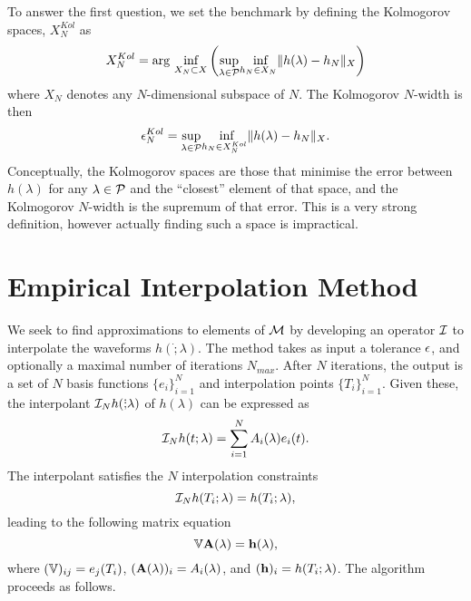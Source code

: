 To answer the first question, we set the benchmark by defining the Kolmogorov spaces, $X^{Kol}_N$ as
\begin{equation}
X^{Kol}_N = \mbox{arg }\underset{X_N \subset X}{\mbox{inf}}\left(\underset{\lambda \in \mathcal{P}}{\sup} \underset{h_N \in X_N}{\mbox{ inf}} \| h(\lambda) - h_N \|_X \right)
\end{equation} 
where $X_N$ denotes any $N$-dimensional subspace of $N$. The Kolmogorov $N$-width is then 
\begin{equation}
\epsilon^{Kol}_N = \underset{\lambda \in \mathcal{P}}{\sup} \underset{h_N \in X^{Kol}_N}{\mbox{ inf}} \| h(\lambda) - h_N \|_X .
\end{equation} 
Conceptually, the Kolmogorov spaces are those that minimise the error between $h(\lambda)$ for any $\lambda \in \mathcal{P}$ and the ``closest'' element of that space, and the Kolmogorov $N$-width is the supremum of that error. This is a very strong definition, however actually finding such a space is impractical. 

\section{Empirical Interpolation Method}

We seek to find approximations to elements of $\mathcal{M}$ by developing an operator $\mathcal{I}$ to interpolate the waveforms $h(\dot;\lambda)$. The method takes as input a tolerance ${\epsilon}$, and optionally a maximal number of iterations $N_{max}$. After $N$ iterations, the output is a set of $N$ basis functions $\{e_i\}_{i=1}^N$ and interpolation points $\{T_i\}_{i=1}^{N}$. Given these, the interpolant $\mathcal{I}_N h(\dot;\lambda)$ of $h(\lambda)$ can be expressed as
\begin{equation}
\mathcal{I}_N h(t;\lambda) = \sum_{i=1}^N  A_i (\lambda) e_i(t).
\end{equation}
The interpolant satisfies the $N$ interpolation constraints
\begin{equation}
\mathcal{I}_N h(T_i;\lambda) = h(T_i;\lambda),
\end{equation}
leading to the following matrix equation
\begin{equation}
\mathbb{V} \mathbf{A}(\lambda)=\mathbf{h}(\lambda),
\end{equation}
where $(\mathbb{V})_{ij}=e_j(T_i)$, $(\mathbf{A}(\lambda))_i=A_i(\lambda)$, and $(\mathbf{h})_i=h(T_i;\lambda)$. The algorithm proceeds as follows.

